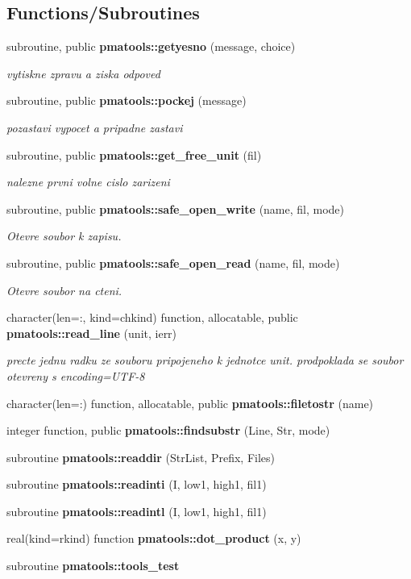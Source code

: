 \subsection*{Functions/\+Subroutines}
\begin{DoxyCompactItemize}
\item 
subroutine, public {\bf pmatools\+::getyesno} (message, choice)
\begin{DoxyCompactList}\small\item\em vytiskne zpravu a ziska odpoved \end{DoxyCompactList}\item 
subroutine, public {\bf pmatools\+::pockej} (message)
\begin{DoxyCompactList}\small\item\em pozastavi vypocet a pripadne zastavi \end{DoxyCompactList}\item 
subroutine, public {\bf pmatools\+::get\+\_\+free\+\_\+unit} (fil)
\begin{DoxyCompactList}\small\item\em nalezne prvni volne cislo zarizeni \end{DoxyCompactList}\item 
subroutine, public {\bf pmatools\+::safe\+\_\+open\+\_\+write} (name, fil, mode)
\begin{DoxyCompactList}\small\item\em Otevre soubor k zapisu. \end{DoxyCompactList}\item 
subroutine, public {\bf pmatools\+::safe\+\_\+open\+\_\+read} (name, fil, mode)
\begin{DoxyCompactList}\small\item\em Otevre soubor na cteni. \end{DoxyCompactList}\item 
character(len=\+:, kind=chkind) function, allocatable, public {\bf pmatools\+::read\+\_\+line} (unit, ierr)
\begin{DoxyCompactList}\small\item\em precte jednu radku ze souboru pripojeneho k jednotce unit. prodpoklada se soubor otevreny s encoding=\textquotesingle{}U\+T\+F-\/8\textquotesingle{} \end{DoxyCompactList}\item 
character(len=\+:) function, allocatable, public {\bf pmatools\+::filetostr} (name)
\item 
integer function, public {\bf pmatools\+::findsubstr} (Line, Str, mode)
\item 
subroutine {\bf pmatools\+::readdir} (Str\+List, Prefix, Files)
\item 
subroutine {\bf pmatools\+::readinti} (I, low1, high1, fil1)
\item 
subroutine {\bf pmatools\+::readintl} (I, low1, high1, fil1)
\item 
real(kind=rkind) function {\bf pmatools\+::dot\+\_\+product} (x, y)
\item 
subroutine {\bf pmatools\+::tools\+\_\+test}
\end{DoxyCompactItemize}
